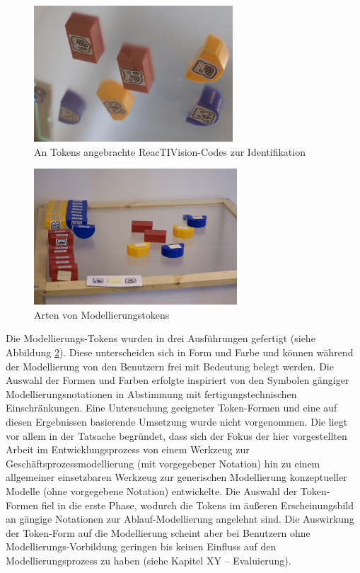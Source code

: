 \begin{figure}[htbp]
	\centering
		\includegraphics[height=2in]{img/ImplementierungInput/TokensCodes.jpg}
	\caption{An Tokens angebrachte ReacTIVision-Codes zur Identifikation}
	\label{fig:img_ImplementierungInput_TokensCodes}
\end{figure}

\begin{figure}[htbp]
	\centering
		\includegraphics[height=2in]{img/ImplementierungInput/TokenTypes.jpg}
	\caption{Arten von Modellierungstokens}
	\label{fig:img_ImplementierungInput_TokenTypes}
\end{figure}


Die Modellierungs-Tokens wurden in drei Ausführungen gefertigt (siehe Abbildung \ref{fig:img_ImplementierungInput_TokenTypes}). Diese unterscheiden sich in Form und Farbe und können während der Modellierung von den Benutzern frei mit Bedeutung belegt werden. Die Auswahl der Formen und Farben erfolgte inspiriert von den Symbolen gängiger Modellierungsnotationen in Abstimmung mit fertigungstechnischen Einschränkungen. Eine Untersuchung geeigneter Token-Formen und eine auf diesen Ergebnissen basierende Umsetzung wurde nicht vorgenommen. Die liegt vor allem in der Tatsache begründet, dass sich der Fokus der hier vorgestellten Arbeit im Entwicklungsprozess von einem Werkzeug zur Geschäftsprozessmodellierung (mit vorgegebener Notation) hin zu einem allgemeiner einsetzbaren Werkzeug zur generischen Modellierung konzeptueller Modelle (ohne vorgegebene Notation) entwickelte. Die Auswahl der Token-Formen fiel in die erste Phase, wodurch die Tokens im äußeren Erscheinungsbild an gängige Notationen zur Ablauf-Modellierung angelehnt sind. Die Auswirkung der Token-Form auf die Modellierung scheint aber bei Benutzern ohne Modellierungs-Vorbildung geringen bis keinen Einfluss auf den Modellierungsprozess zu haben (siehe Kapitel XY -- Evaluierung).

